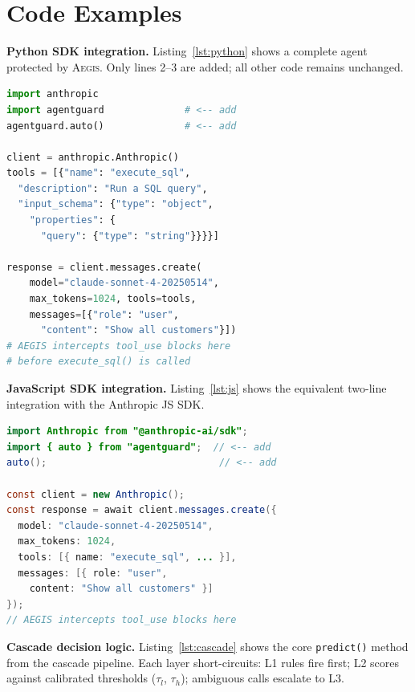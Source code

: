 \documentclass[sigconf]{acmart}
\newcommand{\system}{\textsc{Aegis}\xspace}
\begin{document}
\clearpage



\appendix

\section{Code Examples}
\label{app:code}

\noindent\textbf{Python SDK integration.}
Listing~\ref{lst:python} shows a complete agent protected by \system. Only lines 2--3 are added; all other code remains unchanged.

\begin{lstlisting}[caption={A Claude agent with \system protection.},label=lst:python,language=Python]
import anthropic
import agentguard              # <-- add
agentguard.auto()              # <-- add

client = anthropic.Anthropic()
tools = [{"name": "execute_sql",
  "description": "Run a SQL query",
  "input_schema": {"type": "object",
    "properties": {
      "query": {"type": "string"}}}}]

response = client.messages.create(
    model="claude-sonnet-4-20250514",
    max_tokens=1024, tools=tools,
    messages=[{"role": "user",
      "content": "Show all customers"}])
# AEGIS intercepts tool_use blocks here
# before execute_sql() is called
\end{lstlisting}

\noindent\textbf{JavaScript SDK integration.}
Listing~\ref{lst:js} shows the equivalent two-line integration with the Anthropic JS SDK.

\begin{lstlisting}[caption={A TypeScript agent with \system protection.},label=lst:js,language=Java]
import Anthropic from "@anthropic-ai/sdk";
import { auto } from "agentguard";  // <-- add
auto();                              // <-- add

const client = new Anthropic();
const response = await client.messages.create({
  model: "claude-sonnet-4-20250514",
  max_tokens: 1024,
  tools: [{ name: "execute_sql", ... }],
  messages: [{ role: "user",
    content: "Show all customers" }]
});
// AEGIS intercepts tool_use blocks here
\end{lstlisting}

\noindent\textbf{Cascade decision logic.}
Listing~\ref{lst:cascade} shows the core \texttt{predict()} method from the cascade pipeline. Each layer short-circuits: L1 rules fire first; L2 scores against calibrated thresholds ($\tau_l$, $\tau_h$); ambiguous calls escalate to L3.
\end{document}
